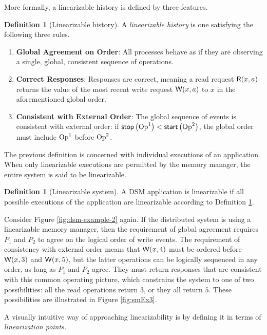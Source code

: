 \documentclass[]             %
{NASA}                       %
\theoremstyle{definition}
\newtheorem{definition}[theorem]{Definition}
\providecommand{\tightlist}{%
  \setlength{\itemsep}{0pt}\setlength{\parskip}{0pt}}
\begin{document}
More formally, a linearizable history is defined by three features.
\begin{definition}[Linearizable history]
  \label{def:linearizable}
  A \emph{linearizable history} is one satisfying the following three rules.
\begin{enumerate}
  \tightlist
\item \textbf{Global Agreement on Order}: All processes behave as if
  they are observing a single, global, consistent sequence of
  operations.
\item \textbf{Correct Responses}: Responses are correct, meaning a read request
  \(\mathsf{R}\!\left(x, a\right)\) returns the value of the most recent write request
  \(\mathsf{W}\!\left(x, a\right)\) to \(x\) in the aforementioned global order.
\item \textbf{Consistent with External Order}: The global sequence of
  events is consistent with external order: if $\mathsf{stop}\left(\mathrm{Op}^1\right) < \mathsf{start}\left(\mathrm{Op}^2\right)$,
  the global order must include $\mathrm{Op}^1$ before $\mathrm{Op}^2$.
\end{enumerate}
\end{definition}

The previous definition is concerned with individual executions of an
application. When only linearizable executions are permitted by the
memory manager, the entire system is said to be linearizable.

\begin{definition}[Linearizable system]
  A DSM application is linearizable if all possible executions of the
  application are linearizable according to Definition \ref{def:linearizable}.
\end{definition}

Consider Figure \ref{fig:dsm-example-2} again. If the distributed system is
using a linearizable memory manager, then the requirement of global
agreement requires $P_1$ and $P_2$ to agree on the logical order of
write events. The requirement of consistency with external order means
that $\mathsf{W}\!\left(x, 4\right)$ must be ordered before $\mathsf{W}\!\left(x, 3\right)$ and
$\mathsf{W}\!\left(x, 5\right)$, but the latter operations can be logically
sequenced in any order, as long as $P_1$ and $P_2$ agree. They must
return responses that are consistent with this common operating
picture, which constrains the system to one of two possibilities: all
the read operations return $3$, or they all return $5$. These
possibilities are illustrated in Figure \ref{fig:smEx3}.

A visually intuitive way of approaching linearizability is by defining
it in terms of \emph{linearization points.}
\end{document}
